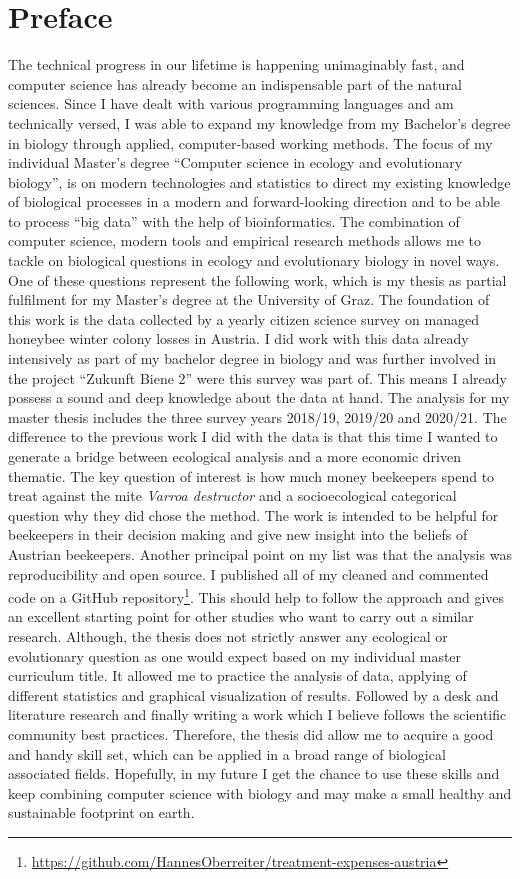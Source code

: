 \chapter*{Preface}
\label{sec:Preface}
\vspace*{-10mm}

The technical progress in our lifetime is happening unimaginably fast, and computer science has already become an indispensable part of the natural sciences. Since I have dealt with various programming languages and am technically versed, I was able to expand my knowledge from my Bachelor's degree in biology through applied, computer-based working methods. The focus of my individual Master's degree \enquote{Computer science in ecology and evolutionary biology}, is on modern technologies and statistics to direct my existing knowledge of biological processes in a modern and forward-looking direction and to be able to process \enquote{big data} with the help of bioinformatics. The combination of computer science, modern tools and empirical research methods allows me to tackle on biological questions in ecology and evolutionary biology in novel ways. One of these questions represent the following work, which is my thesis as partial fulfilment for my Master's degree at the University of Graz. The foundation of this work is the data collected by a yearly citizen science survey on managed honeybee winter colony losses in Austria. I did work with this data already intensively as part of my bachelor degree in biology and was further involved in the project \enquote{Zukunft Biene 2} were this survey was part of. This means I already possess a sound and deep knowledge about the data at hand. The analysis for my master thesis includes the three survey years 2018/19, 2019/20 and 2020/21. The difference to the previous work I did with the data is that this time I wanted to generate a bridge between ecological analysis and a more economic driven thematic. The key question of interest is how much money beekeepers spend to treat against the mite \textit{Varroa destructor} and a socioecological categorical question why they did chose the method. The work is intended to be helpful for beekeepers in their decision making and give new insight into the beliefs of Austrian beekeepers. Another principal point on my list was that the analysis was reproducibility and open source. I published all of my cleaned and commented code on a GitHub repository\footnote{\url{https://github.com/HannesOberreiter/treatment-expenses-austria}}. This should help to follow the approach and gives an excellent starting point for other studies who want to carry out a similar research. Although, the thesis does not strictly answer any ecological or evolutionary question as one would expect based on my individual master curriculum title. It allowed me to practice the analysis of data, applying of different statistics and graphical visualization of results. Followed by a desk and literature research and finally writing a work which I believe follows the scientific community best practices. Therefore, the thesis did allow me to acquire a good and handy skill set, which can be applied in a broad range of biological associated fields. Hopefully, in my future I get the chance to use these skills and keep combining computer science with biology and may make a small healthy and sustainable footprint on earth.